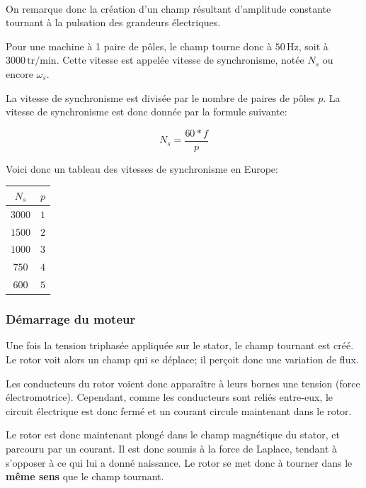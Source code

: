 \documentclass[11pt]{article}
\begin{document}
    \begin{center}
    \end{center}
    { \hspace*{\fill} \\}
    
    On remarque donc la création d'un champ résultant d'amplitude constante
tournant à la pulsation des grandeurs électriques.

    Pour une machine à 1 paire de pôles, le champ tourne donc à
\(50\, \mathrm{Hz}\), soit à \(3000\, \mathrm{tr/min}\). Cette vitesse
est appelée vitesse de synchronisme, notée \(N_s\) ou encore
\(\omega_s\).

    La vitesse de synchronisme est divisée par le nombre de paires de pôles
\(p\). La vitesse de synchronisme est donc donnée par la formule
suivante:

\[ N_s = \frac{60*f}{p} \]

    Voici donc un tableau des vitesses de synchronisme en Europe:

\begin{longtable}[]{@{}cc@{}}
\toprule
\(N_s\) & \(p\)\tabularnewline
\midrule
\endhead
\(3000\) & \(1\)\tabularnewline
\(1500\) & \(2\)\tabularnewline
\(1000\) & \(3\)\tabularnewline
\(750\) & \(4\)\tabularnewline
\(600\) & \(5\)\tabularnewline
\bottomrule
\end{longtable}

    \hypertarget{duxe9marrage-du-moteur}{%
\subsubsection{Démarrage du moteur}\label{duxe9marrage-du-moteur}}

    Une fois la tension triphasée appliquée sur le stator, le champ tournant
est créé. Le rotor voit alors un champ qui se déplace; il perçoit donc
une variation de flux.

    Les conducteurs du rotor voient donc apparaître à leurs bornes une
tension (force électromotrice). Cependant, comme les conducteurs sont
reliés entre-eux, le circuit électrique est donc fermé et un courant
circule maintenant dans le rotor.

    Le rotor est donc maintenant plongé dans le champ magnétique du stator,
et parcouru par un courant. Il est donc soumis à la force de Laplace,
tendant à s'opposer à ce qui lui a donné naissance. Le rotor se met donc
à tourner dans le \textbf{même sens} que le champ tournant.
\end{document}
